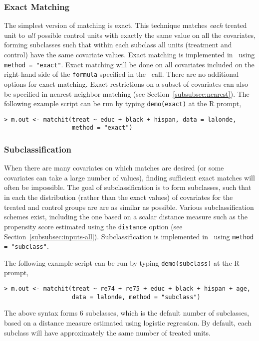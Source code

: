 \subsubsection{Exact Matching}
\label{subsubsec:exact}

The simplest version of matching is exact.  This technique matches
\emph{each} treated unit to \emph{all} possible control units with
exactly the same value on all the covariates, forming subclasses such
that within each subclass all units (treatment and control) have the
same covariate values.  Exact matching is implemented in \MatchIt\ 
using \texttt{method = "exact"}.  Exact matching will be done on all
covariates included on the right-hand side of the \texttt{formula}
specified in the \MatchIt\ call.  There are no additional options for
exact matching.  Exact restrictions on a subset of covariates can also
be specified in nearest neighbor matching (see
Section~\ref{subsubsec:nearest}).  The following example script can be
run by typing {\tt demo(exact)} at the R prompt,
\begin{verbatim}
> m.out <- matchit(treat ~ educ + black + hispan, data = lalonde, 
                   method = "exact")
\end{verbatim}

\subsubsection{Subclassification}
\label{subsubsec:subclass}

When there are many covariates on which matches are desired (or some
covariates can take a large number of values), finding sufficient
exact matches will often be impossible.  The goal of subclassification
is to form subclasses, such that in each the distribution (rather than
the exact values) of covariates for the treated and control groups are
are as similar as possible.  Various subclassification schemes exist,
including the one based on a scalar distance measure such as the
propensity score estimated using the \texttt{distance} option (see
Section~\ref{subsubsec:inputs-all}).  Subclassification is implemented
in \MatchIt\ using \texttt{method = "subclass"}.

The following example script can be run by typing {\tt demo(subclass)}
at the R prompt,
\begin{verbatim}
> m.out <- matchit(treat ~ re74 + re75 + educ + black + hispan + age, 
                   data = lalonde, method = "subclass")
\end{verbatim}
The above syntax forms 6 subclasses, which is the default number
of subclasses, based on a distance measure estimated using logistic
regression.  By default, each subclass will have approximately the
same number of treated units.

